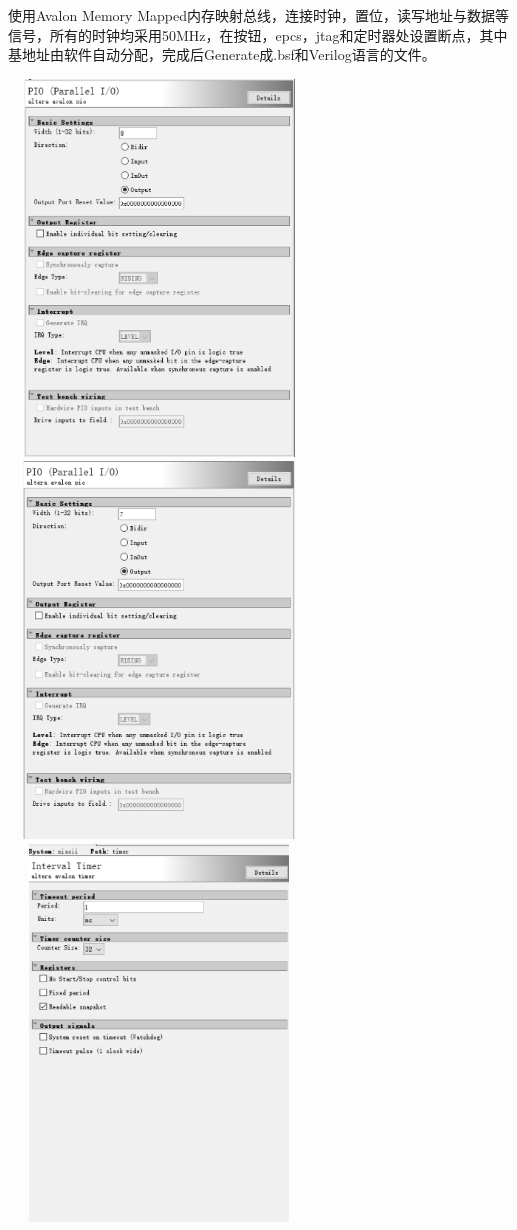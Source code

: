 \documentclass[UTF8]{ctexart}
\begin{document}
使用Avalon Memory Mapped内存映射总线，连接时钟，置位，读写地址与数据等信号，所有的时钟均采用50MHz，在按钮，epcs，jtag和定时器处设置断点，其中基地址由软件自动分配，完成后Generate成.bsf和Verilog语言的文件。
\begin{center}
	\includegraphics[width=8cm,height=10cm]{led.eps}
	\includegraphics[width=8cm,height=10cm]{seg1.eps}
	\includegraphics[width=8cm,height=10cm]{timer.eps}

\end{center}
\end{document}
